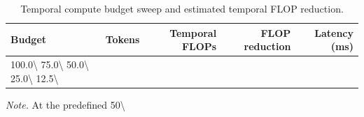 \begin{table}[t]
\centering
\caption{Temporal compute budget sweep and estimated temporal FLOP reduction.}
\label{tab:compute_budget}
\begin{tabular}{lrrrr}
\toprule
Budget & Tokens & Temporal FLOPs & FLOP reduction & Latency (ms) \\
\midrule
100.0\textbackslash{}%
75.0\textbackslash{}%
50.0\textbackslash{}%
25.0\textbackslash{}%
12.5\textbackslash{}%
\bottomrule
\end{tabular}
\par\smallskip\noindent\footnotesize\textit{Note.} At the predefined 50\textbackslash{}%
\end{table}
